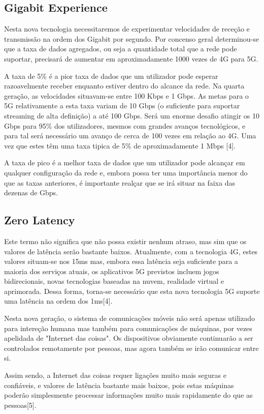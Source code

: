 \documentclass[conference]{IEEEtran}
\begin{document}
\subsection{Gigabit Experience}
Nesta nova tecnologia necessitaremos de experimentar velocidades de receção e transmissão na ordem dos Gigabit por segundo. Por concenso geral determinou-se que a taxa de dados agregados, ou seja a quantidade total que a rede pode suportar, precisará de aumentar em aproximadamente 1000 vezes de 4G para 5G. \par
A taxa de 5\% é a pior taxa de dados que um utilizador pode esperar razoavelmente receber enquanto estiver dentro do alcance da rede. Na quarta geração, as velocidades situavam-se entre 100 Kbps e 1 Gbps. As metas para o 5G relativamente a esta taxa variam de 10 Gbps (o suficiente para suportar streaming de alta definição) a até 100 Gbps. Será um enorme desafio atingir os 10 Gbps para 95\% dos utilizadores, mesmos com grandes avanços tecnológicos, e para tal será necessário um avanço de cerca de 100 vezes em relação ao 4G. Uma vez que estes têm uma taxa tipica de 5\% de aproximadamente 1 Mbps [4]. \par
A taxa de pico é a melhor taxa de dados que um utilizador pode alcançar em qualquer configuração da rede e, embora possa ter uma importância menor do que as taxas anteriores, é importante realçar que se irá situar na faixa das dezenas de Gbps.

\subsection{Zero Latency}
Este termo não significa que não possa existir nenhum atraso, mas sim que os valores de latência serão bastante baixos.
Atualmente, com a tecnologia 4G, estes valores situam-se nos 15ms mas, embora essa latência seja suficiente para a maioria dos serviços atuais, os aplicativos 5G previstos incluem jogos bidirecionais, novas tecnologias baseadas na nuvem, realidade virtual e aprimorada. Dessa forma, torna-se necessário que esta nova tecnologia 5G suporte uma latência na ordem dos 1ms[4].\par
Nesta nova geração, o sistema de comunicações móveis não será apenas utilizado para intereção humana mas também para comunicações de máquinas, por vezes apelidada de "Internet das coisas". Os dispositivos obviamente continuarão a ser controlados remotamente por pessoas, mas agora também se irão comunicar entre si.\par
Assim sendo, a Internet das coisas requer ligações muito mais seguras e confiáveis, e valores de latência bastante mais baixos, pois estas máquinas poderão simplesmente processar informações muito mais rapidamente do que as pessoas[5].
\end{document}
